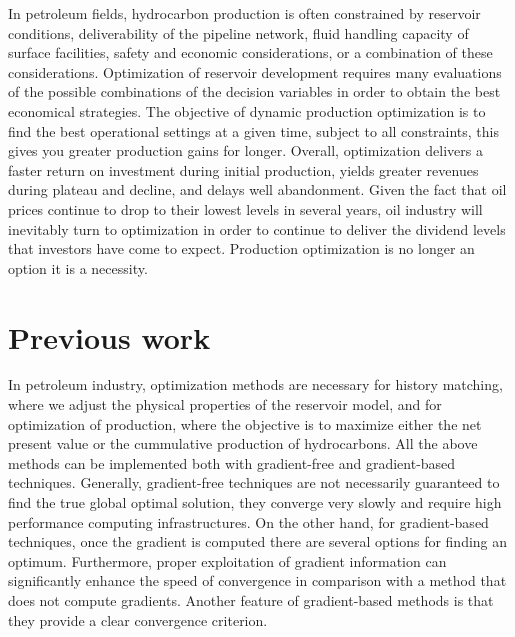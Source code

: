 In petroleum fields, hydrocarbon production is often constrained by reservoir 
conditions, deliverability of the pipeline network, fluid handling capacity of 
surface facilities, safety and economic considerations, or a combination of 
these considerations. Optimization of reservoir development requires many 
evaluations of the possible combinations of the decision variables in order to 
obtain the best economical strategies. The objective of dynamic production 
optimization is to find the best operational settings at a given time, subject 
to all constraints, this gives you greater production gains for longer. 
Overall, optimization delivers a faster return on investment during initial 
production, yields greater revenues during plateau and decline, and delays well abandonment.
Given the fact that oil prices continue to drop to their lowest levels in 
several years, oil industry will inevitably turn to optimization in order to continue to 
deliver the dividend levels that investors have come to expect. Production 
optimization is no longer an option it is a necessity.

\section{Previous work}
In petroleum industry, optimization methods are necessary for history 
matching, where we adjust the physical properties of the 
reservoir model, and for optimization of production, where the objective is to maximize either the net present value 
or the cummulative production of hydrocarbons.
All the above methods can be 
implemented both with gradient-free and gradient-based techniques. 
Generally, gradient-free techniques are not necessarily guaranteed to find the true global optimal solution, they converge 
very slowly and require high performance computing infrastructures.
On the other hand, for gradient-based techniques, once the gradient is computed there are several options for finding an optimum.
Furthermore, proper exploitation of gradient information can significantly enhance the speed of convergence in comparison with a method
that does not compute gradients. Another feature of gradient-based methods is that they provide a clear convergence criterion.

